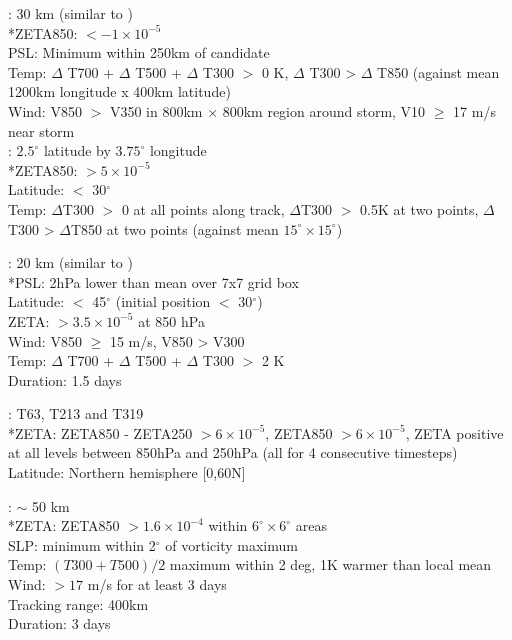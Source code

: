 \documentclass[gmdd, hvmath, online]{copernicus_discussions}
\begin{document}
\cite{walsh2004fine}:  30 km (similar to \cite{nguyen2001interannual}) \\
*ZETA850:  $< - 1 \times 10^{-5}$ \\
PSL:  Minimum within 250km of candidate \\
Temp:  $\Delta$ T700 + $\Delta$ T500 + $\Delta$ T300 $>$ 0 K, $\Delta$ T300 > $\Delta$ T850 (against mean 1200km longitude x 400km latitude) \\
Wind:  V850 $>$ V350 in 800km $\times$ 800km region around storm, V10 $\geq$ 17 m/s near storm \\

\cite{mcdonald2005tropical}:  $2.5^\circ$ latitude by $3.75^\circ$ longitude \\
*ZETA850:  $> 5 \times 10^{-5}$ \\
Latitude: $<$ 30$^\circ$ \\
Temp:  $\Delta$T300 $>$ 0 at all points along track, $\Delta$T300 $>$ 0.5K at two points, $\Delta$T300 > $\Delta$T850 at two points (against mean $15^\circ \times 15^\circ$)

\cite{oouchi2006tropical}:  20 km (similar to \cite{sugi2002influence}) \\
*PSL:  2hPa lower than mean over 7x7 grid box \\
Latitude: $<$ 45$^\circ$ (initial position $<$ 30$^\circ$) \\
ZETA:  $> 3.5 \times 10^{-5}$ at 850 hPa \\
Wind:  V850 $\geq$ 15 m/s, V850 > V300 \\
Temp:  $\Delta$ T700 + $\Delta$ T500 + $\Delta$ T300 $>$ 2 K \\
Duration:  1.5 days

\cite{bengtsson2007how}:  T63, T213 and T319 \\
*ZETA:  ZETA850 - ZETA250 $> 6 \times 10^{-5}$, ZETA850 $> 6 \times 10^{-5}$, ZETA positive at all levels between 850hPa and 250hPa (all for 4 consecutive timesteps)
Latitude:  Northern hemisphere [0,60N]

\cite{zhao2009simulations}:  $\sim$ 50 km \\
*ZETA:  ZETA850 $> 1.6 \times 10^{-4}$ within $6^\circ \times 6^\circ$ areas \\
SLP:  minimum within 2$^\circ$ of vorticity maximum \\
Temp:  $(T300 + T500)/2$ maximum within 2 deg, 1K warmer than local mean \\
Wind:  $> 17$ m/s for at least 3 days \\
Tracking range:  400km \\
Duration:  3 days
\end{document}
